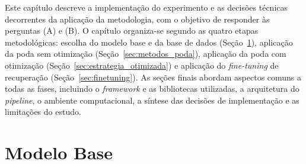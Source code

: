 Este capítulo descreve a implementação do experimento e as decisões técnicas decorrentes da
aplicação da metodologia, com o objetivo de responder às perguntas (A) e (B). O capítulo
organiza-se segundo as quatro etapas metodológicas: escolha do modelo base e da base de dados
(Seção~\ref{sec:etapa1}), aplicação da poda sem otimização (Seção~\ref{sec:metodos_poda}),
aplicação da poda com otimização (Seção~\ref{sec:estrategia_otimizada}) e aplicação do
\textit{fine-tuning} de recuperação (Seção~\ref{sec:finetuning}). As seções finais abordam
aspectos comuns a todas as fases, incluindo o \textit{framework} e as bibliotecas
utilizadas, a arquitetura do \textit{pipeline}, o ambiente computacional, a síntese das
decisões de implementação e as limitações do estudo.


\section{Modelo Base}\label{sec:etapa1}

